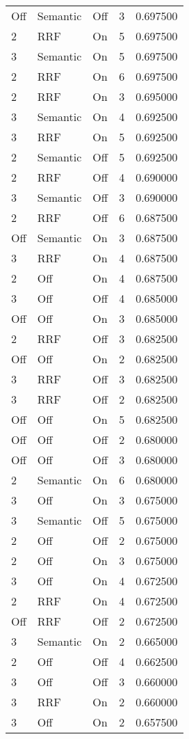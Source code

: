 \begin{tabular}{llllr}
Off & Semantic & Off & 3 & 0.697500 \\
2 & RRF & On & 5 & 0.697500 \\
3 & Semantic & On & 5 & 0.697500 \\
2 & RRF & On & 6 & 0.697500 \\
2 & RRF & On & 3 & 0.695000 \\
3 & Semantic & On & 4 & 0.692500 \\
3 & RRF & On & 5 & 0.692500 \\
2 & Semantic & Off & 5 & 0.692500 \\
2 & RRF & Off & 4 & 0.690000 \\
3 & Semantic & Off & 3 & 0.690000 \\
2 & RRF & Off & 6 & 0.687500 \\
Off & Semantic & On & 3 & 0.687500 \\
3 & RRF & On & 4 & 0.687500 \\
2 & Off & On & 4 & 0.687500 \\
3 & Off & Off & 4 & 0.685000 \\
Off & Off & On & 3 & 0.685000 \\
2 & RRF & Off & 3 & 0.682500 \\
Off & Off & On & 2 & 0.682500 \\
3 & RRF & Off & 3 & 0.682500 \\
3 & RRF & Off & 2 & 0.682500 \\
Off & Off & On & 5 & 0.682500 \\
Off & Off & Off & 2 & 0.680000 \\
Off & Off & Off & 3 & 0.680000 \\
2 & Semantic & On & 6 & 0.680000 \\
3 & Off & On & 3 & 0.675000 \\
3 & Semantic & Off & 5 & 0.675000 \\
2 & Off & Off & 2 & 0.675000 \\
2 & Off & On & 3 & 0.675000 \\
3 & Off & On & 4 & 0.672500 \\
2 & RRF & On & 4 & 0.672500 \\
Off & RRF & Off & 2 & 0.672500 \\
3 & Semantic & On & 2 & 0.665000 \\
2 & Off & Off & 4 & 0.662500 \\
3 & Off & Off & 3 & 0.660000 \\
3 & RRF & On & 2 & 0.660000 \\
3 & Off & On & 2 & 0.657500 \\

\end{tabular}
